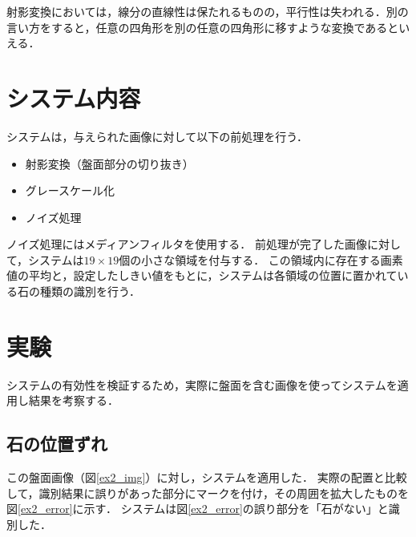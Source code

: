 \documentclass[summary]{nitocs}
\numberwithin{equation}{section}
\begin{document}
            射影変換においては，線分の直線性は保たれるものの，平行性は失われる．別の言い方をすると，任意の四角形を別の任意の四角形に移すような変換であるといえる．

    \section{システム内容} \label{system}
        システムは，与えられた画像に対して以下の前処理を行う．
        \begin{itemize}
            \item 射影変換（盤面部分の切り抜き）
            \item グレースケール化
            \item ノイズ処理
        \end{itemize}
        ノイズ処理にはメディアンフィルタを使用する．
        前処理が完了した画像に対して，システムは$19\times19$個の小さな領域を付与する．
        この領域内に存在する画素値の平均と，設定したしきい値をもとに，システムは各領域の位置に置かれている石の種類の識別を行う．

    \section{実験} \label{experiment}
        システムの有効性を検証するため，実際に盤面を含む画像を使ってシステムを適用し結果を考察する．
        \subsection{石の位置ずれ} \label{ex2}%
            この盤面画像（図\ref{ex2_img}）に対し，システムを適用した．
            実際の配置と比較して，識別結果に誤りがあった部分にマークを付け，その周囲を拡大したものを図\ref{ex2_error}に示す．
            システムは図\ref{ex2_error}の誤り部分を「石がない」と識別した．
\end{document}
